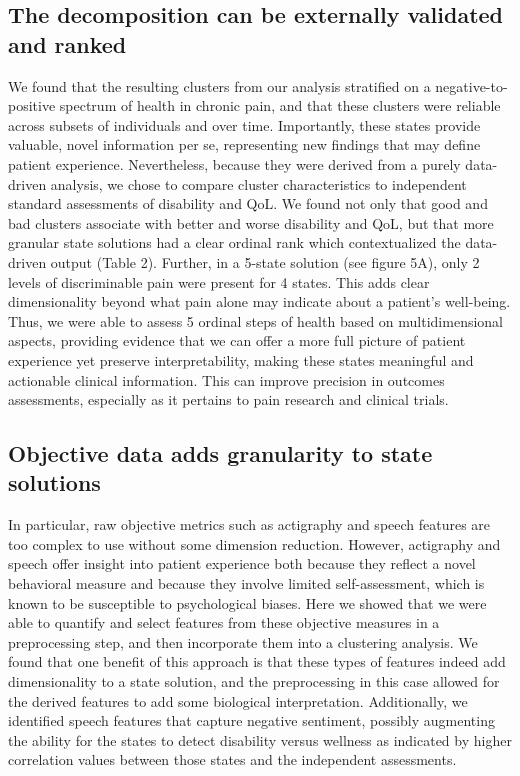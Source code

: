 \documentclass[conference]{IEEEtran}
\begin{document}
\subsection{The decomposition can be externally validated and ranked} 
We found that the resulting clusters from our analysis stratified on a negative-to-positive spectrum of health in chronic pain, and that these clusters were reliable across subsets of individuals and over time. Importantly, these states provide valuable, novel information per se, representing new findings that may define patient experience. Nevertheless, because they were derived from a purely data-driven analysis, we chose to compare cluster characteristics to independent standard assessments of disability and QoL. We found not only that good and bad clusters associate with better and worse disability and QoL, but that more granular state solutions had a clear ordinal rank which contextualized the data-driven output (Table 2). Further, in a 5-state solution (see figure 5A), only 2 levels of discriminable pain were present for 4 states. This adds clear dimensionality beyond what pain alone may indicate about a patient's well-being. Thus, we were able to assess 5 ordinal steps of health based on multidimensional aspects, providing evidence that we can offer a more full picture of patient experience yet preserve interpretability, making these states meaningful and actionable clinical information. This can improve precision in outcomes assessments, especially as it pertains to pain research and clinical trials. 

\subsection{Objective data adds granularity to state solutions} 
In particular, raw objective metrics such as actigraphy and speech features are too complex to use without some dimension reduction. However, actigraphy and speech offer insight into patient experience both because they reflect a novel behavioral measure and because they involve limited self-assessment, which is known to be susceptible to psychological biases. Here we showed that we were able to quantify and select features from these objective measures in a preprocessing step, and then incorporate them into a clustering analysis. We found that one benefit of this approach is that these types of features indeed add dimensionality to a state solution, and the preprocessing in this case allowed for the derived features to add some biological interpretation. Additionally, we identified speech features that capture negative sentiment, possibly augmenting the ability for the states to detect disability versus wellness as indicated by higher correlation values between those states and the independent assessments. 
\end{document}
